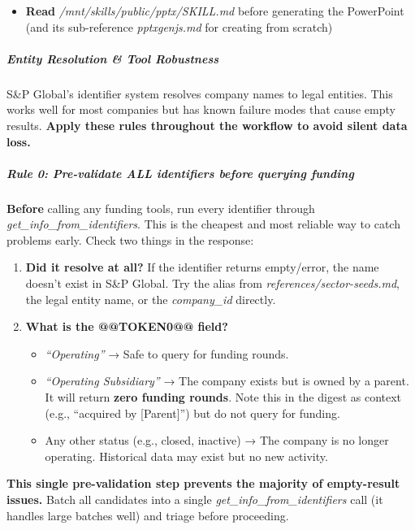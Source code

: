 \documentclass[11pt]{article}
\begin{document}
\begin{itemize}[leftmargin=*,itemsep=2pt,topsep=2pt]
\item {} \textbf{Read} \emph{/mnt/skills/public/pptx/SKILL.md} before generating the PowerPoint (and its sub-reference \emph{pptxgenjs.md} for creating from scratch)
\end{itemize}

\subparagraph{Entity Resolution \& Tool Robustness}\mbox{}\par

S\&P Global's identifier system resolves company names to legal entities. This works well for most companies but has known failure modes that cause empty results. \textbf{Apply these rules throughout the workflow to avoid silent data loss.}


\subparagraph{Rule 0: Pre-validate ALL identifiers before querying funding}\mbox{}\par

\textbf{Before} calling any funding tools, run every identifier through \emph{get\_\allowbreak{}info\_\allowbreak{}from\_\allowbreak{}identifiers}. This is the cheapest and most reliable way to catch problems early. Check two things in the response:


\begin{enumerate}[leftmargin=*,itemsep=2pt,topsep=2pt]
\item {} \textbf{Did it resolve at all?} If the identifier returns empty/error, the name doesn't exist in S\&P Global. Try the alias from \emph{references/sector-seeds.md}, the legal entity name, or the \emph{company\_\allowbreak{}id} directly.
\item {} \textbf{What is the @@TOKEN0@@ field?}
\begin{itemize}[leftmargin=*,itemsep=2pt,topsep=2pt]
\item {} \emph{``Operating''} → Safe to query for funding rounds.
\item {} \emph{``Operating Subsidiary''} → The company exists but is owned by a parent. It will return \textbf{zero funding rounds}. Note this in the digest as context (e.g., ``acquired by [Parent]'') but do not query for funding.
\item {} Any other status (e.g., closed, inactive) → The company is no longer operating. Historical data may exist but no new activity.
\end{itemize}
\end{enumerate}

\textbf{This single pre-validation step prevents the majority of empty-result issues.} Batch all candidates into a single \emph{get\_\allowbreak{}info\_\allowbreak{}from\_\allowbreak{}identifiers} call (it handles large batches well) and triage before proceeding.
\end{document}
